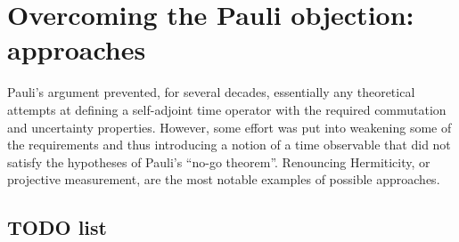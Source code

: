 \section{Overcoming the Pauli objection: approaches}

Pauli's argument prevented, for several decades, essentially any theoretical attempts at
defining a self-adjoint time operator with the required commutation and uncertainty properties.
However, some effort was put into weakening some of the requirements and thus
introducing a notion of a time observable that did not satisfy the hypotheses
of Pauli's ``no-go theorem''. Renouncing Hermiticity, or projective measurement, are
the most notable examples of possible approaches.

\subsection*{TODO list}

